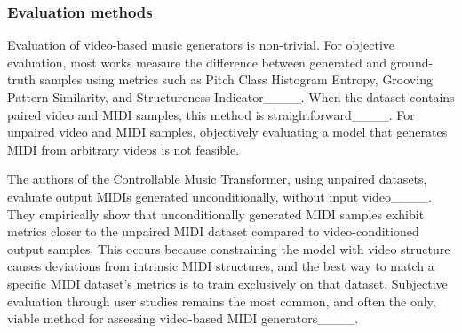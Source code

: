 \subsubsection{Evaluation methods}
\label{sec:related_eval}

Evaluation of video-based music generators is non-trivial. For objective evaluation, most works measure the difference between generated and ground-truth samples using metrics such as Pitch Class Histogram Entropy, Grooving Pattern Similarity, and Structureness Indicator____.
When the dataset contains paired video and MIDI samples, this method is straightforward____. For unpaired video and MIDI samples, objectively evaluating a model that generates MIDI from arbitrary videos is not feasible. 

The authors of the Controllable Music Transformer, using unpaired datasets, evaluate output MIDIs generated unconditionally, without input video____. 
They empirically show that unconditionally generated MIDI samples exhibit metrics closer to the unpaired MIDI dataset compared to video-conditioned output samples. This occurs because constraining the model with video structure causes deviations from intrinsic MIDI structures, and the best way to match a specific MIDI dataset’s metrics is to train exclusively on that dataset.
Subjective evaluation through user studies remains the most common, and often the only, viable method for assessing video-based MIDI generators____.